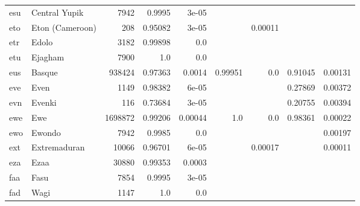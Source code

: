 \documentclass[11pt]{article}
\begin{document}
\begin{table*}[h]
{\begin{tabular}{llrrrrrrr}
esu         & Central Yupik         & 7942         & 0.9995         & 3e-05         &          &          &          &          \\

eto         & Eton (Cameroon)         & 208         & 0.95082         & 3e-05         &          & 0.00011         &          &          \\

etr         & Edolo         & 3182         & 0.99898         & 0.0         &          &          &          &          \\

etu         & Ejagham         & 7900         & 1.0         & 0.0         &          &          &          &          \\

eus         & Basque         & 938424         & 0.97363         & 0.0014         & 0.99951         & 0.0         & 0.91045         & 0.00131         \\

eve         & Even         & 1149         & 0.98382         & 6e-05         &          &          & 0.27869         & 0.00372         \\

evn         & Evenki         & 116         & 0.73684         & 3e-05         &          &          & 0.20755         & 0.00394         \\

ewe         & Ewe         & 1698872         & 0.99206         & 0.00044         & 1.0         & 0.0         & 0.98361         & 0.00022         \\

ewo         & Ewondo         & 7942         & 0.9985         & 0.0         &          &          &          & 0.00197         \\

ext         & Extremaduran         & 10066         & 0.96701         & 6e-05         &          & 0.00017         &          & 0.00011         \\

eza         & Ezaa         & 30880         & 0.99353         & 0.0003         &          &          &          &          \\

faa         & Fasu         & 7854         & 0.9995         & 3e-05         &          &          &          &          \\

fad         & Wagi         & 1147         & 1.0         & 0.0         &          &          &          &          \\


\end{tabular}}
\end{table*}
\end{document}
